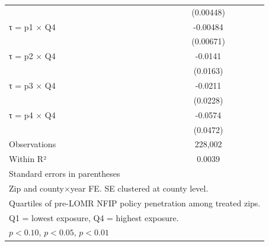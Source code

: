 \begin{table}[htbp]
\begin{tabular}{l*{1}{c}}
                    &   (0.00448)         \\
[1em]
τ = p1 × Q4         &    -0.00484         \\
                    &   (0.00671)         \\
[1em]
τ = p2 × Q4         &     -0.0141         \\
                    &    (0.0163)         \\
[1em]
τ = p3 × Q4         &     -0.0211         \\
                    &    (0.0228)         \\
[1em]
τ = p4 × Q4         &     -0.0574         \\
                    &    (0.0472)         \\
\hline
Observations        &     228,002         \\
Within R²           &      0.0039         \\
\hline\hline
\multicolumn{2}{l}{\footnotesize Standard errors in parentheses}\\
\multicolumn{2}{l}{\footnotesize Zip and county×year FE. SE clustered at county level.}\\
\multicolumn{2}{l}{\footnotesize Quartiles of pre-LOMR NFIP policy penetration among treated zips.}\\
\multicolumn{2}{l}{\footnotesize Q1 = lowest exposure, Q4 = highest exposure.}\\
\multicolumn{2}{l}{\footnotesize \sym{*} \(p<0.10\), \sym{**} \(p<0.05\), \sym{***} \(p<0.01\)}\\
\end{tabular}
\end{table}

